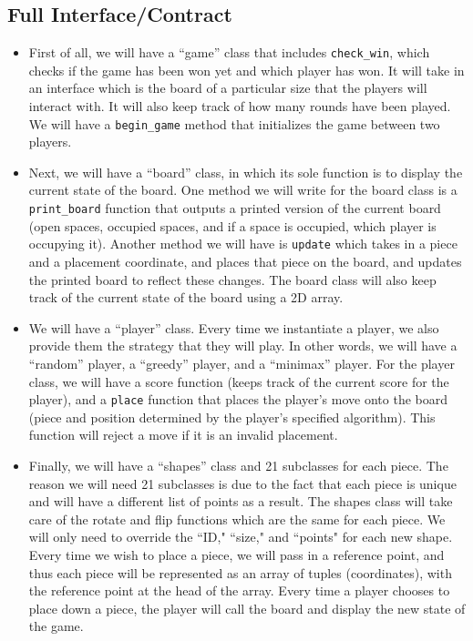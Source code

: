 \documentclass[11pt]{article}
\begin{document}
\subsection{Full Interface/Contract}
\begin{itemize}
\item First of all, we will have a ``game'' class that includes \texttt{check\_win}, which checks if the game has been won yet and which player has won. It will take in an interface which is the board of a particular size that the players will interact with. It will also keep track of how many rounds have been played. We will have a \texttt{begin\_game} method that initializes the game between two players.
\item Next, we will have a ``board'' class, in which its sole function is to display the current state of the board. One method we will write for the board class is a \texttt{print\_board} function that outputs a printed version of the current board (open spaces, occupied spaces, and if a space is occupied, which player is occupying it). Another method we will have is \texttt{update} which takes in a piece and a placement coordinate, and places that piece on the board, and updates the printed board to reflect these changes. The board class will also keep track of the current state of the board using a 2D array.
\item We will have a ``player'' class. Every time we instantiate a player, we also provide them the strategy that they will play. In other words, we will have a ``random'' player, a ``greedy'' player, and a ``minimax'' player. For the player class, we will have a score function (keeps track of the current score for the player), and a \texttt{place} function that places the player's move onto the board (piece and position determined by the player's specified algorithm). This function will reject a move if it is an invalid placement. 
\item Finally, we will have a ``shapes'' class and 21 subclasses for each piece. The reason we will need 21 subclasses is due to the fact that each piece is unique and will have a different list of points as a result. The shapes class will take care of the rotate and flip functions which are the same for each piece. We will only need to override the ``ID," ``size," and ``points" for each new shape. Every time we wish to place a piece, we will pass in a reference point, and thus each piece will be represented as an array of tuples (coordinates), with the reference point at the head of the array. Every time a player chooses to place down a piece, the player will call the board and display the new state of the game.
\end{itemize}
\end{document}
